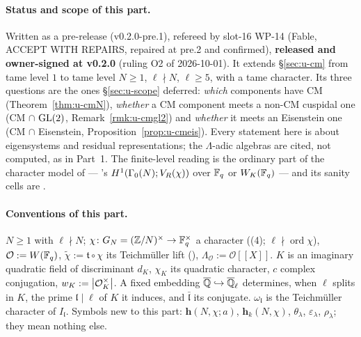 \documentclass[11pt]{article}
\newcommand{\Iw}{\Lambda}                         %
\newcommand{\hcusp}{\mathbf{h}}                   %
\newcommand{\Qlb}{\overline{\Q}_\ell}
\begin{document}
\paragraph{Status and scope of this part.} Written as a pre-release (v0.2.0-pre.1), refereed by slot-16 WP-14 (Fable, ACCEPT WITH REPAIRS, repaired at
pre.2 and confirmed), \textbf{released and owner-signed at v0.2.0} (ruling O2 of 2026-10-01). It extends \S\ref{sec:u-cm} from tame level $1$ to tame level $N\ge1$, $\ell\nmid N$, $\ell\ge5$, with a
tame character. Its three questions are the ones \S\ref{sec:u-scope} deferred: \emph{which} components have CM (Theorem~\ref{thm:u-cmN}),
\emph{whether} a CM component meets a non-CM cuspidal one (CM $\cap$ $\mathrm{GL}(2)$, Remark~\ref{rmk:u-cmgl2}) and \emph{whether} it meets an Eisenstein one
(CM $\cap$ Eisenstein, Proposition~\ref{prop:u-cmeis}). Every statement here is about eigensystems and residual representations; the
$\Iw$-adic algebras are cited, not computed, as in Part~1. The finite-level reading is the ordinary part of the character model of
 --- 's $H^{1}(\Gamma_0(N);V_{R}(\chi))$ over $\mathbb{F}_q$ or $W_K(\mathbb{F}_q)$ --- and its sanity cells are .

\paragraph{Conventions of this part.} $N\ge1$ with $\ell\nmid N$; $\chi\colon G_N=(\mathbb{Z}/N)^{\times}\to\mathbb{F}_q^{\times}$ a character ((4); $\ell\nmid\operatorname{ord}\chi$),
$\mathcal O:=W(\mathbb{F}_q)$, $\tilde\chi:=\mathfrak t\circ\chi$ its Teichm\"uller lift (), $\Iw_{\mathcal O}:=\mathcal O[[X]]$. $K$ is an imaginary quadratic
field of discriminant $d_K$, $\chi_K$ its quadratic character, $c$ complex conjugation, $w_K:=\left| \mathcal O_K^{\times} \right|$. A fixed embedding
$\overline\Q\hookrightarrow\Qlb$ determines, when $\ell$ splits in $K$, the prime $\mathfrak l\mid\ell$ of $K$ it induces, and $\bar{\mathfrak l}$ its conjugate.
$\omega_{\mathfrak l}$ is the Teichm\"uller character of $I_{\mathfrak l}$. Symbols new to this part: $\hcusp(N,\chi;a)$, $\hcusp_k(N,\chi)$, $\theta_\lambda$, $\varepsilon_\lambda$,
$\rho_\lambda$; they mean nothing else.
\end{document}

